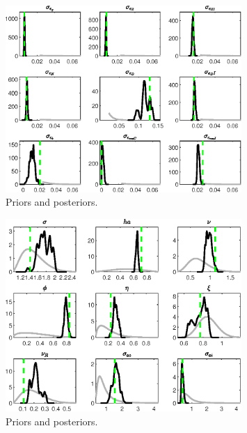 
\begin{figure}[H]
\centering
\includegraphics[width=0.80\textwidth]{BRS_sectoral_artificial_data/Output/BRS_sectoral_artificial_data_PriorsAndPosteriors1}
\caption{Priors and posteriors.}\label{Fig:PriorsAndPosteriors:1}
\end{figure}
 
\begin{figure}[H]
\centering
\includegraphics[width=0.80\textwidth]{BRS_sectoral_artificial_data/Output/BRS_sectoral_artificial_data_PriorsAndPosteriors2}
\caption{Priors and posteriors.}\label{Fig:PriorsAndPosteriors:2}
\end{figure}
 
